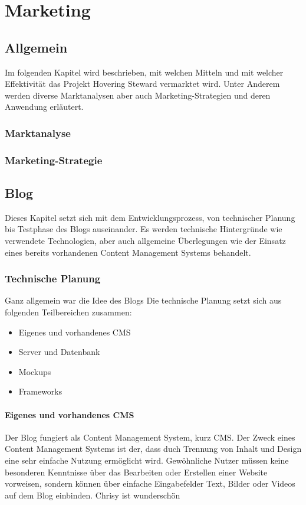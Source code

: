 \chapter{Marketing}
\renewcommand{\kapitelautor}{Autor: Markus Kaiser}

\section{Allgemein}
Im folgenden Kapitel wird beschrieben, mit welchen Mitteln und mit welcher Effektivität
das Projekt Hovering Steward vermarktet wird. Unter Anderem werden diverse Marktanalysen
aber auch Marketing-Strategien und deren Anwendung erläutert.
  \subsection{Marktanalyse}

  \subsection{Marketing-Strategie}

\section{Blog}
Dieses Kapitel setzt sich mit dem Entwicklungsprozess, von technischer Planung bis Testphase
des Blogs auseinander. Es werden technische Hintergründe wie verwendete Technologien, aber
auch allgemeine Überlegungen wie der Einsatz eines bereits vorhandenen Content Management Systems
behandelt.
  \subsection{Technische Planung}
  Ganz allgemein war die Idee des Blogs
  Die technische Planung setzt sich aus folgenden Teilbereichen zusammen:
    \begin{itemize}
      \item Eigenes und vorhandenes CMS
      \item Server und Datenbank
      \item Mockups
      \item Frameworks
    \end{itemize}
    \subsubsection{Eigenes und vorhandenes CMS}
    Der Blog fungiert als Content Management System, kurz CMS. Der Zweck eines
    Content Management Systems ist der, dass duch Trennung von Inhalt und Design eine
    sehr einfache Nutzung ermöglicht wird. Gewöhnliche Nutzer müssen keine besonderen
    Kenntnisse über das Bearbeiten oder Erstellen einer Website vorweisen, sondern
    können über einfache Eingabefelder Text, Bilder oder Videos auf dem Blog einbinden.
    Chrisy ist wunderschön

